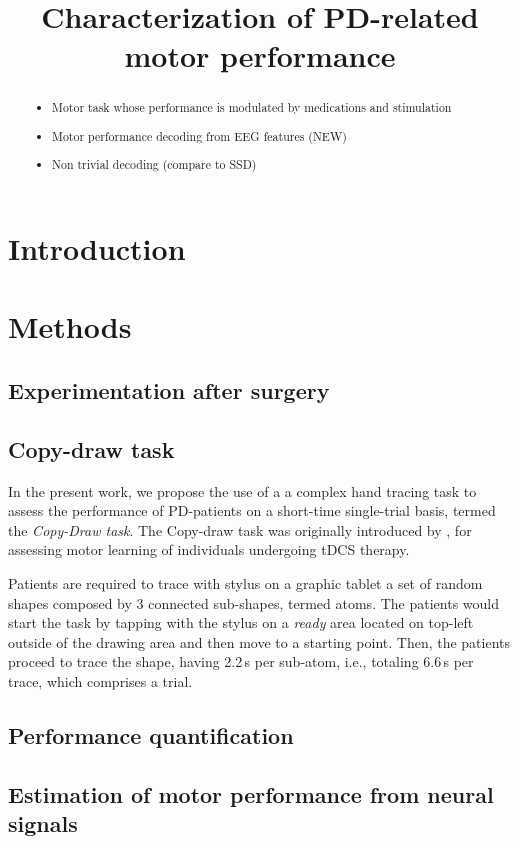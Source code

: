\documentclass[10pt,a4paper]{article}
\title{Characterization of  PD-related motor performance}
\begin{document}
\begin{abstract}

\begin{itemize}
\item Motor task whose performance is modulated by medications and stimulation
\item Motor performance decoding from EEG features (NEW)
\item Non trivial decoding (compare to SSD)
\end{itemize}
\end{abstract}

\section{Introduction}
\section{Methods}
\subsection{Experimentation after surgery}
\subsection{Copy-draw task}
In the present work, we propose the use of a a complex hand tracing task to assess the performance of PD-patients on a short-time single-trial basis, termed the \textit{Copy-Draw task}. The Copy-draw task was originally introduced by \cite{prichard2014effects}, for assessing motor learning of individuals undergoing tDCS therapy.

Patients are required to trace with stylus on a graphic tablet a set of random shapes composed by 3 connected sub-shapes, termed atoms. The patients would start the task by tapping with the stylus on a \textit{ready} area located on top-left outside of the drawing area and then move to a starting point. Then, the patients proceed to trace the shape, having 2.2\,s per sub-atom, i.e., totaling 6.6\,s per trace, which comprises a trial.


\subsection{Performance quantification}

\subsection{Estimation of motor performance from neural signals}
\end{document}
